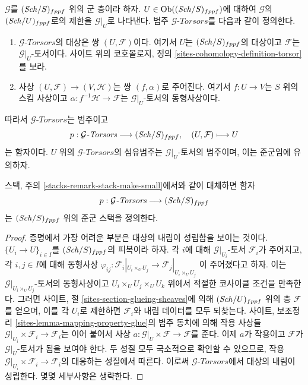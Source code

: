 \noindent
$\mathcal{G}$를 $(\mathit{Sch}/S)_{fppf}$ 위의 군 층이라 하자.
$U \in \mathop{\mathrm{Ob}}\nolimits((\mathit{Sch}/S)_{fppf})$에 대하여 $\mathcal{G}$의
$(\mathit{Sch}/U)_{fppf}$로의 제한을 $\mathcal{G}|_U$로 나타낸다. 범주
$\mathcal{G}\textit{-Torsors}$를 다음과 같이 정의한다.
\begin{enumerate}
\item $\mathcal{G}\textit{-Torsors}$의 대상은 쌍 $(U, \mathcal{F})$이다.
여기서 $U$는 $(\mathit{Sch}/S)_{fppf}$의 대상이고 $\mathcal{F}$는
$\mathcal{G}|_U$-토서이다. 사이트 위의 코호몰로지, 정의
\ref{sites-cohomology-definition-torsor}를 보라.
\item 사상 $(U, \mathcal{F}) \to (V, \mathcal{H})$는 쌍
$(f, \alpha)$로 주어진다. 여기서 $f : U \to V$는 $S$ 위의 스킴 사상이고
$\alpha : f^{-1}\mathcal{H} \to \mathcal{F}$는
$\mathcal{G}|_U$-토서의 동형사상이다.
\end{enumerate}
따라서 $\mathcal{G}\textit{-Torsors}$는 범주이고
$$
p : \mathcal{G}\textit{-Torsors} \longrightarrow (\mathit{Sch}/S)_{fppf},
\quad
(U, \mathcal{F}) \longmapsto U
$$
는 함자이다. $U$ 위의 $\mathcal{G}\textit{-Torsors}$의 섬유범주는
$\mathcal{G}|_U$-토서의 범주이며, 이는 준군임에 유의하자.

\begin{lemma}
\label{lemma-torsors-sheaf-stack-in-groupoids}
스택, 주의 \ref{stacks-remark-stack-make-small}에서와 같이 대체하면 함자
$$
p : \mathcal{G}\textit{-Torsors} \longrightarrow (\mathit{Sch}/S)_{fppf}
$$
는 $(\mathit{Sch}/S)_{fppf}$ 위의 준군 스택을 정의한다.
\end{lemma}

\begin{proof}
증명에서 가장 어려운 부분은 대상의 내림이 성립함을 보이는 것이다.
$\{U_i \to U\}_{i \in I}$를 $(\mathit{Sch}/S)_{fppf}$의 피복이라 하자.
각 $i$에 대해 $\mathcal{G}|_{U_i}$-토서 $\mathcal{F}_i$가 주어지고,
각 $i, j \in I$에 대해 동형사상
$\varphi_{ij} :
\mathcal{F}_i|_{U_i \times_U U_j} \to \mathcal{F}_j|_{U_i \times_U U_j}$
이 주어졌다고 하자. 이는 $\mathcal{G}|_{U_i \times_U U_j}$-토서의
동형사상이고 $U_i \times_U U_j \times_U U_k$ 위에서 적절한 코사이클
조건을 만족한다. 그러면 사이트, 절
\ref{sites-section-glueing-sheaves}에 의해 $(\mathit{Sch}/U)_{fppf}$ 위의 층
$\mathcal{F}$를 얻으며, 이를 각 $U_i$로 제한하면 $\mathcal{F}_i$와
내림 데이터를 모두 되찾는다. 사이트, 보조정리
\ref{sites-lemma-mapping-property-glue}의 범주 동치에 의해 작용 사상들
$\mathcal{G}|_{U_i} \times \mathcal{F}_i \to \mathcal{F}_i$는 이어 붙어서
사상 $a : \mathcal{G}|_U \times \mathcal{F} \to \mathcal{F}$를 준다.
이제 $a$가 작용이고 $\mathcal{F}$가 $\mathcal{G}|_U$-토서가 됨을 보여야
한다. 두 성질 모두 국소적으로 확인할 수 있으므로, 작용
$\mathcal{G}|_{U_i} \times \mathcal{F}_i \to \mathcal{F}_i$의 대응하는
성질에서 따른다. 이로써 $\mathcal{G}\textit{-Torsors}$에서 대상의
내림이 성립한다. 몇몇 세부사항은 생략한다.
\end{proof}




